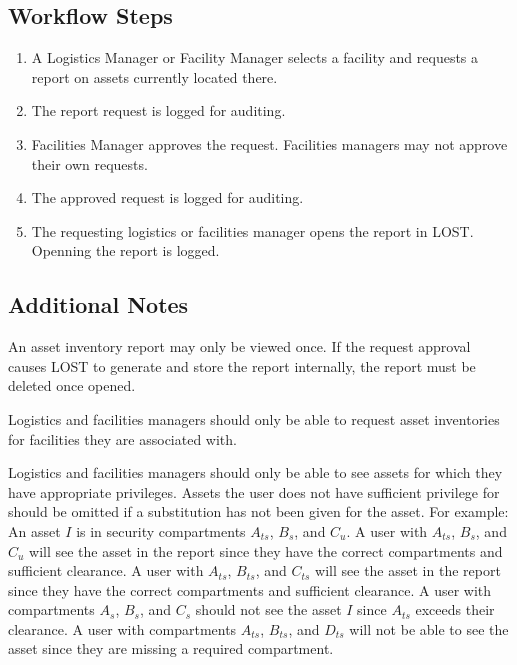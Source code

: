 \subsection*{Workflow Steps}
\begin{enumerate}
\item A Logistics Manager or Facility Manager selects a facility and requests a report on assets currently located there.
\item The report request is logged for auditing.
\item Facilities Manager approves the request. Facilities managers may not approve their own requests.
\item The approved request is logged for auditing.
\item The requesting logistics or facilities manager opens the report in LOST. Openning the report is logged.
\end{enumerate}
\subsection*{Additional Notes}
An asset inventory report may only be viewed once. If the request approval causes LOST to generate and store the report internally, the report must be deleted once opened.

Logistics and facilities managers should only be able to request asset inventories for facilities they are associated with.

Logistics and facilities managers should only be able to see assets for which they have appropriate privileges. Assets the user does not have sufficient privilege for should be omitted if a substitution has not been given for the asset. For example:
An asset $I$ is in security compartments $A_{ts}$, $B_s$, and $C_u$. A user with $A_{ts}$, $B_{s}$, and $C_{u}$ will see the asset in the report since they have the correct compartments and sufficient clearance. A user with $A_{ts}$, $B_{ts}$, and $C_{ts}$ will see the asset in the report since they have the correct compartments and sufficient clearance. A user with compartments $A_s$, $B_s$, and $C_s$ should not see the asset $I$ since $A_{ts}$ exceeds their clearance. A user with compartments $A_{ts}$, $B_{ts}$, and $D_{ts}$ will not be able to see the asset since they are missing a required compartment.